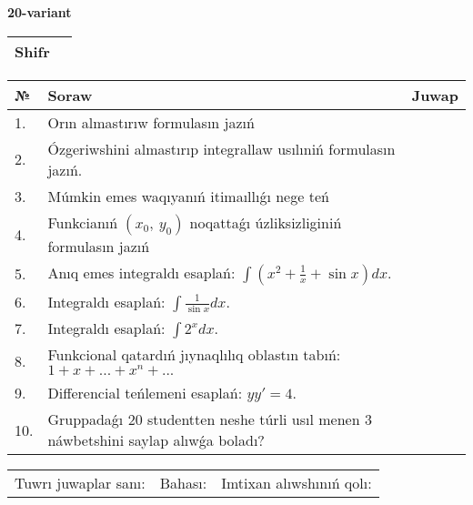 \documentclass{article}
\begin{document}
  \egroup
  
  \newpage
  
  
  \textbf{20-variant}\\
  
  \bgroup
  \def\arraystretch{1.6} %
  
  \begin{tabular}{|m{5.7cm}|m{9.5cm}|}
  \hline
  Shifr & \\
  \hline
  \end{tabular}
  
  \vspace{1cm}
  
  \begin{tabular}{|m{0.7cm}|m{10cm}|m{4cm}|}
  \hline
  № & Soraw & Juwap \\
  \hline
  1. & Orın almastırıw formulasın jazıń &  \\
  \hline
  2. & Ózgeriwshini almastırıp integrallaw usılıniń formulasın jazıń. &  \\
  \hline
  3. & Múmkin emes waqıyanıń itimaıllıǵı nege teń &  \\
  \hline
  4. & Funkcianıń \((x_{0},\ y_{0})\) noqattaǵı úzliksizliginiń formulasın jazıń &  \\
  \hline
  5. & Anıq emes integraldı esaplań: \(\int{\left( x^2  + \frac{1}{x} + \sin x \right)dx}\). &  \\
  \hline
  6. & Integraldı esaplań: \(\int{\frac{1}{\sin x}dx}\). &  \\
  \hline
  7. & Integraldı esaplań: \(\int{2^{x}dx}\). &  \\
  \hline
  8. & Funkcional qatardıń jıynaqlılıq oblastın tabıń:\(1 + x + ... + x^{n} + ...\) &  \\
  \hline
  9. & Differencial teńlemeni esaplań: \(yy' = 4\). &  \\
  \hline
  10. & Gruppadaǵı 20 studentten neshe túrli usıl menen 3 náwbetshini saylap alıwǵa boladı? &  \\
  \hline
  \end{tabular}
  
  \vspace{1cm}
  
  \begin{tabular}{lll}
  Tuwrı juwaplar sanı: \underline{\hspace{1.5cm}} & 
  Bahası: \underline{\hspace{1.5cm}} & 
  Imtixan alıwshınıń qolı: \underline{\hspace{2cm}} \\
  \end{tabular}
  
\end{document}
